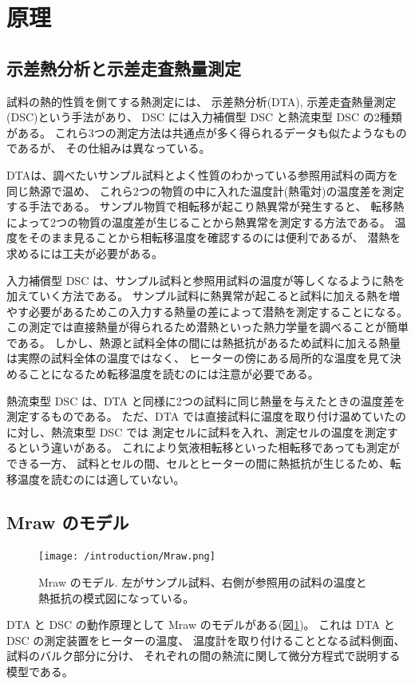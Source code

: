 \documentclass[9pt,dvipdfmx,a4paper]{jsarticle}
\begin{document}

\begin{abstract}
\end{abstract}


\section{原理}
\subsection{示差熱分析と示差走査熱量測定}
試料の熱的性質を側てする熱測定には、
示差熱分析(DTA), 示差走査熱量測定(DSC)という手法があり、
DSC には入力補償型 DSC と熱流束型 DSC の2種類がある。
これら3つの測定方法は共通点が多く得られるデータも似たようなものであるが、
その仕組みは異なっている。

DTAは、調べたいサンプル試料とよく性質のわかっている参照用試料の両方を同じ熱源で温め、
これら2つの物質の中に入れた温度計(熱電対)の温度差を測定する手法である。
サンプル物質で相転移が起こり熱異常が発生すると、
転移熱によって2つの物質の温度差が生じることから熱異常を測定する方法である。
温度をそのまま見ることから相転移温度を確認するのには便利であるが、
潜熱を求めるには工夫が必要がある。

入力補償型 DSC は、サンプル試料と参照用試料の温度が等しくなるように熱を加えていく方法である。
サンプル試料に熱異常が起こると試料に加える熱を増やす必要があるためこの入力する熱量の差によって潜熱を測定することになる。
この測定では直接熱量が得られるため潜熱といった熱力学量を調べることが簡単である。
しかし、熱源と試料全体の間には熱抵抗があるため試料に加える熱量は実際の試料全体の温度ではなく、
ヒーターの傍にある局所的な温度を見て決めることになるため転移温度を読むのには注意が必要である。

熱流束型 DSC は、DTA と同様に2つの試料に同じ熱量を与えたときの温度差を測定するものである。
ただ、DTA では直接試料に温度を取り付け温めていたのに対し、熱流束型 DSC では
測定セルに試料を入れ、測定セルの温度を測定するという違いがある。
これにより気液相転移といった相転移であっても測定ができる一方、
試料とセルの間、セルとヒーターの間に熱抵抗が生じるため、転移温度を読むのには適していない。


\subsection{Mraw のモデル}
\begin{figure}
    \centering
    \texttt{[image: /introduction/Mraw.png]}
    \caption{Mraw のモデル\cite{Mraw}.
    左がサンプル試料、右側が参照用の試料の温度と熱抵抗の模式図になっている。}
    \label{fig:Mraw}
\end{figure}
DTA と DSC の動作原理として Mraw のモデル\cite{Mraw}がある(図\ref{fig:Mraw})。
これは DTA と DSC の測定装置をヒーターの温度、
温度計を取り付けることとなる試料側面、
試料のバルク部分に分け、
それぞれの間の熱流に関して微分方程式で説明する模型である。
\end{document}
